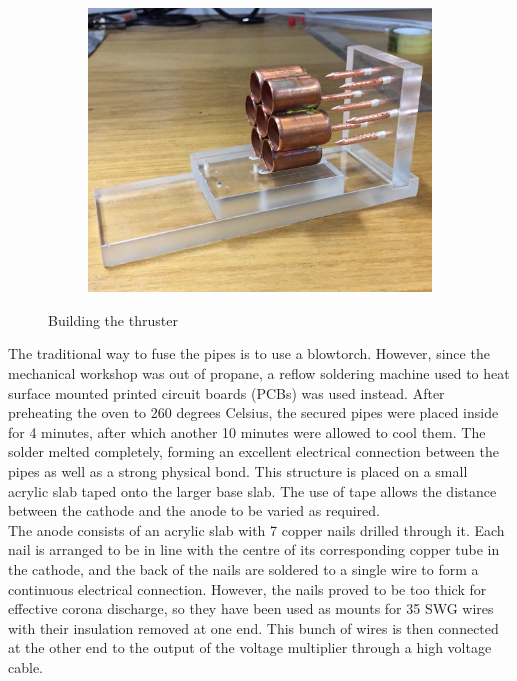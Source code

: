 \documentclass[11pt]{article}
\begin{document}
\begin{figure}[h!]
\begin{subfigure}{0.3\textwidth}
\includegraphics[width = \textwidth]{thruster_3}
\caption{}
\label{fig:thruster_3}
\end{subfigure}
\caption{\label{fig:thruster_construct} Building the thruster}
\end{figure}

The traditional way to fuse the pipes is to use a blowtorch. However, since the mechanical workshop was out of propane, a reflow soldering machine used to heat surface mounted printed circuit boards (PCBs) was used instead. After preheating the oven to 260 degrees Celsius,  the secured pipes were placed inside for 4 minutes, after which another 10 minutes were allowed to cool them. The solder melted completely, forming an excellent electrical connection between the pipes as well as a strong physical bond. This structure is placed on a small acrylic slab taped onto the larger base slab. The use of tape allows the distance between the cathode and the anode to be varied as required.\\

The anode consists of an acrylic slab with 7 copper nails  drilled through it. Each nail is arranged to be in line with the centre of its corresponding copper tube in the cathode, and the back of the nails are soldered to a single wire to form a continuous electrical connection. However, the nails proved to be too thick for effective corona discharge, so they have been used as mounts for 35 SWG wires with their insulation removed at one end. This bunch of wires is then connected at the other end to the output of the voltage multiplier through a high voltage cable.
\end{document}

